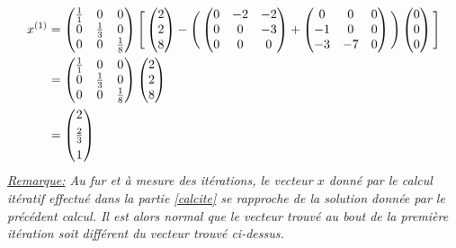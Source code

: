 \begin{align}
x^{(1)}&=\begin{pmatrix}
  \frac{1}{1}&0&0\\
  0&\frac{1}{3}&0\\
  0&0&\frac{1}{8}\\
\end{pmatrix}\Bigg[\begin{pmatrix}
  2 \\
  2 \\
  8 \\
\end{pmatrix}-\Bigg(\begin{pmatrix}
  0&-2&-2\\
  0&0&-3\\
  0&0&0\\
\end{pmatrix}+\begin{pmatrix}
  0&0&0\\
  -1&0&0\\
  -3&-7&0\\
\end{pmatrix}\Bigg)\begin{pmatrix}
  0 \\
  0 \\
  0 \\
\end{pmatrix}\Bigg]\\
&=\begin{pmatrix}
  \frac{1}{1}&0&0\\
  0&\frac{1}{3}&0\\
  0&0&\frac{1}{8}\\
\end{pmatrix}\begin{pmatrix}
  2 \\
  2 \\
  8 \\
\end{pmatrix}\\
&=\begin{pmatrix}
  2 \vspace{4pt}\\
  \frac{2}{3} \vspace{4pt}\\
  1 \\
\end{pmatrix}
\end{align}
\textit{\underline{Remarque:} Au fur et à mesure des itérations, le vecteur $x$ donné par le calcul itératif effectué dans la partie \ref{calcite} se rapproche de la solution donnée par le précédent calcul. Il est alors normal que le vecteur trouvé au bout de la première itération soit différent du vecteur trouvé ci-dessus.}
